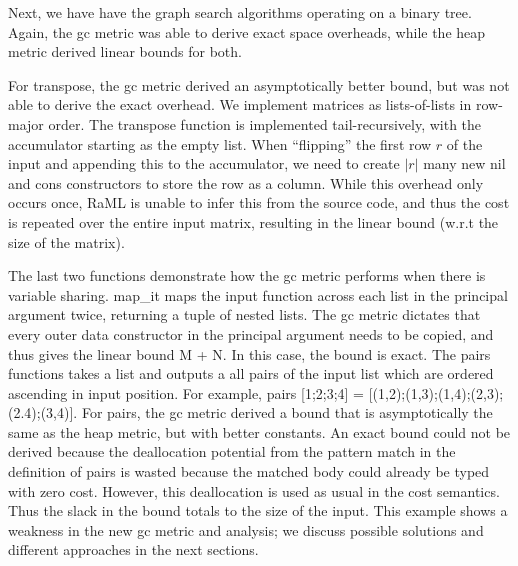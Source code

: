 \documentclass{easychair}
\theoremstyle{definition}
\begin{document}
Next, we have have the graph search algorithms operating on a binary tree. Again, the gc metric
was able to derive exact space overheads, while the heap metric derived linear bounds for both.

For transpose, the gc metric derived an asymptotically better bound, but was not able to derive 
the exact overhead. We implement matrices as lists-of-lists in row-major order. 
The transpose function is implemented tail-recursively, with the accumulator starting as the 
empty list. When ``flipping'' the first row $r$ of the input and appending this to the accumulator, 
we need to create $|r|$ many new nil and cons constructors to store the row as a column. While this
overhead only occurs once, RaML is unable to infer this from the source code, and thus the cost
is repeated over the entire input matrix, resulting in the linear bound (w.r.t the size of the 
matrix). 

The last two functions demonstrate how the gc metric performs when there is variable sharing.
map\_it maps the input function across each list in the principal argument twice, returning a
tuple of nested lists. The gc metric dictates that every outer data constructor in the 
principal argument needs to be copied, and thus gives the linear bound M + N. In this case,
the bound is exact. The pairs functions takes a list and outputs a all pairs of the input list 
which are ordered ascending in input position. For example, 
pairs [1;2;3;4] = [(1,2);(1,3);(1,4);(2,3);(2.4);(3,4)]. For pairs, the gc metric derived a bound
that is asymptotically the same as the heap metric, but with better constants. An exact bound 
could not be derived because the deallocation potential from the pattern match in the 
definition of pairs is wasted because the matched body could already be typed with zero cost. 
However, this deallocation is used as usual in the cost semantics. Thus the slack in the bound 
totals to the size of the input. This example shows a weakness in the new gc metric and analysis; 
we discuss possible solutions and different approaches in the next sections. 
\end{document}
